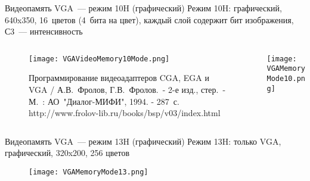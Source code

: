 \documentclass[aspectratio=169,14pt]{beamer}
\begin{document}
\begin{frame}{Видеопамять VGA~--- режим 10H (графический)}
    Режим 10H: графический, 640x350, 16~цветов (4~бита на цвет),
    каждый слой содержит бит изображения, С3~--- интенсивность
    \begin{columns}
        \begin{column}{0.65\textwidth}
            \begin{figure}
                \centering
                \texttt{[image: VGAVideoMemory10Mode.png]}
                \caption{\tiny{Программирование видеоадаптеров CGA, EGA и VGA / А.В.~Фролов, Г.В.~Фролов.~- 2-е изд., стер.~- М.~: АО~"Диалог-МИФИ", 1994. - 287~с. http://www.frolov-lib.ru/books/bsp/v03/index.html}}
            \end{figure}
        \end{column}
        \begin{column}{0.35\textwidth}
            \texttt{[image: VGAMemoryMode10.png]}
        \end{column}
    \end{columns}
\end{frame}


\begin{frame}{Видеопамять VGA~--- режим 13H (графический)}
    Режим 13H: только VGA, графический, 320x200, 256 цветов
    \begin{figure}
        \centering
        \texttt{[image: VGAMemoryMode13.png]}
    \end{figure}
\end{frame}
\end{document}
